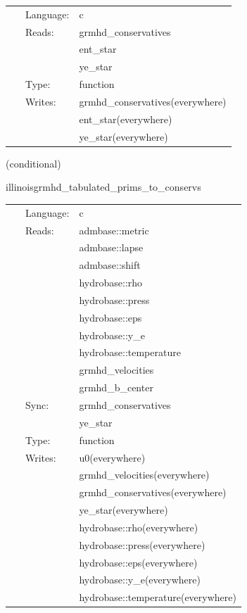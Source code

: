 \documentclass{article}
\begin{document}
\hspace{5mm}

 \begin{tabular*}{160mm}{cll} 
~ & Language:  & c \\ 
~ & Reads:  & grmhd\_conservatives \\ 
~& ~ &ent\_star\\ 
~& ~ &ye\_star\\ 
~ & Type:  & function \\ 
~ & Writes:  & grmhd\_conservatives(everywhere) \\ 
~& ~ &ent\_star(everywhere)\\ 
~& ~ &ye\_star(everywhere)\\ 
\end{tabular*} 


\vspace{5mm}

   (conditional) 

\hspace{5mm} illinoisgrmhd\_tabulated\_prims\_to\_conservs 

\hspace{5mm}{\it tabulated version of illinoisgrmhd\_prims\_to\_conservs } 


\hspace{5mm}

 \begin{tabular*}{160mm}{cll} 
~ & Language:  & c \\ 
~ & Reads:  & admbase::metric \\ 
~& ~ &admbase::lapse\\ 
~& ~ &admbase::shift\\ 
~& ~ &hydrobase::rho\\ 
~& ~ &hydrobase::press\\ 
~& ~ &hydrobase::eps\\ 
~& ~ &hydrobase::y\_e\\ 
~& ~ &hydrobase::temperature\\ 
~& ~ &grmhd\_velocities\\ 
~& ~ &grmhd\_b\_center\\ 
~ & Sync:  & grmhd\_conservatives \\ 
~& ~ &ye\_star\\ 
~ & Type:  & function \\ 
~ & Writes:  & u0(everywhere) \\ 
~& ~ &grmhd\_velocities(everywhere)\\ 
~& ~ &grmhd\_conservatives(everywhere)\\ 
~& ~ &ye\_star(everywhere)\\ 
~& ~ &hydrobase::rho(everywhere)\\ 
~& ~ &hydrobase::press(everywhere)\\ 
~& ~ &hydrobase::eps(everywhere)\\ 
~& ~ &hydrobase::y\_e(everywhere)\\ 
~& ~ &hydrobase::temperature(everywhere)\\ 
\end{tabular*} 
\end{document}
